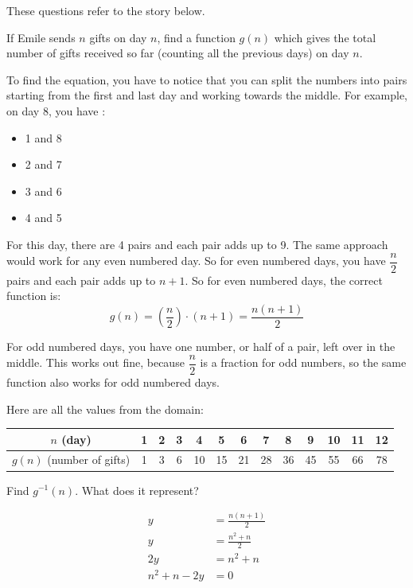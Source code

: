 \documentclass[fleqn,addpoints]{exam}
\begin{document}
These questions refer to the story below.
\begin{questions}

\question 
If Emile sends $n$ gifts on day $n$, find a function $g(n)$ which gives the total number of gifts received so far
(counting all the previous days) on day $n$. 

\begin{solution}
To find the equation, you have to notice that you can split the numbers into pairs starting from the first and last day and
working towards the middle.  For example, on day 8, you have :
\begin{itemize}
  \item 1 and 8
  \item 2 and 7
  \item 3 and 6
  \item 4 and 5
\end{itemize}


For this day, there are 4 pairs and each pair adds up to 9.  The same approach would work for any even numbered day.
So for even numbered days, you have $\dfrac{n}{2}$ pairs and each pair adds up to $n+1$.  So for even numbered days, the
correct function is:
\[
  g(n) = \left( \frac{n}{2} \right) \cdot (n+1) = \frac{n(n+1)}{2}
\]

For odd numbered days, you have one number, or half of a pair, left over in the middle.  This works out fine, because
$\dfrac{n}{2}$ is a fraction for odd numbers, so the same function also works for odd numbered days.

Here are all the values from the domain:

\begin{tabular}{|c|c|c|c|c|c|c|c|c|c|c|c|c|}
\hline
  $n$ (day)                & 1 & 2 & 3 & 4 & 5  & 6   & 7 & 8  & 9 & 10 & 11 & 12 \\
\hline
  $g(n)$ (number of gifts) & 1 & 3 & 6 & 10 & 15 & 21 & 28 & 36 & 45 & 55 & 66 & 78 \\
\hline
\end{tabular}

\end{solution}
\question

Find $g^{-1}(n)$.  What does it represent?

\begin{solution}

\begin{align*}
  y &= \frac{n(n+1)}{2} \\
  y  &= \frac{n^2+n}{2} \\
  2y  &= n^2+n \\
  n^2+n -2y &= 0 \\
\end{align*}


\end{solution}
\end{questions}
\end{document}
